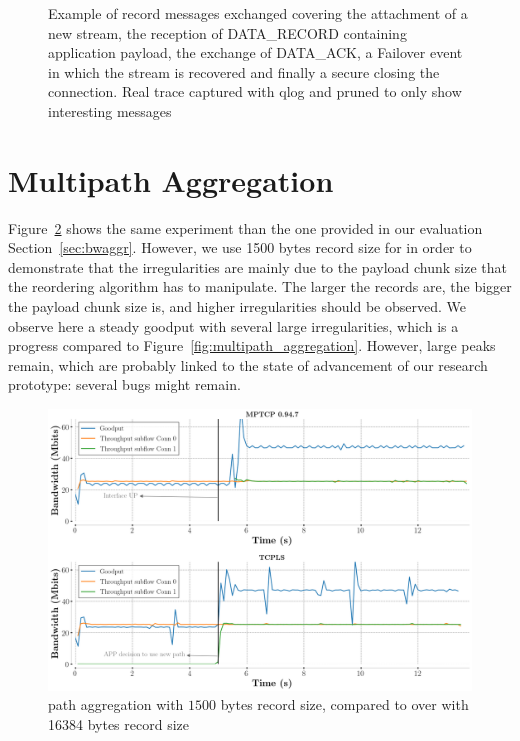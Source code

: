 \begin{figure}[!t]
  \caption{Example of record messages exchanged covering the attachment of a
    new stream, the reception of DATA\_RECORD containing application payload, the exchange of DATA\_ACK, a Failover
    event in which the stream is recovered and finally a secure closing the
    connection. Real trace captured with qlog and pruned to only show
    interesting messages}
  \label{fig:protocol_example}
\end{figure}

\section{Multipath Aggregation}
\label{appendix:aggr}

Figure~\ref{fig:aggregation_1500bytes_records} shows the same experiment than
the one provided in our evaluation Section~\ref{sec:bwaggr}. However, we use
1500 bytes record size for \tcpls in order to demonstrate that the
irregularities are mainly due to the payload chunk size that the reordering
algorithm has to manipulate. The larger the records are, the bigger
the payload chunk size is, and higher irregularities should be observed. We
observe here a steady goodput with several large irregularities, which is a
progress compared to Figure~\ref{fig:multipath_aggregation}. However, large
peaks remain, which are probably linked to the state of advancement of our
research prototype: several bugs might remain.

\begin{figure}
  \includegraphics[width=\columnwidth]{figures/aggregate_1500bytes_records_dual.png}
  \caption{\tcpls path aggregation with $1500$ bytes record size, compared to
    \tls over \mptcp with 16384 bytes record size}
  \label{fig:aggregation_1500bytes_records}
\end{figure}
